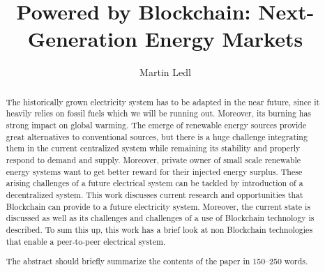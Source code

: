 \documentclass[runningheads]{llncs}
\begin{document}
%
\title{Powered by Blockchain: Next-Generation Energy Markets}
%
%
\author{Martin Ledl}
%
%
%
\maketitle              %
%
\begin{abstract}
The historically grown electricity system has to be adapted in the near future, since it heavily relies on fossil fuels which we will be running out. Moreover, its burning has strong impact on global warming. The emerge of renewable energy sources provide great alternatives to conventional sources, but there is a huge challenge integrating them in the current centralized system while remaining its stability and properly respond to demand and supply. Moreover, private owner of small scale renewable energy systems want to get better reward for their injected energy surplus. These arising challenges of a future electrical system can be tackled by introduction of a decentralized system. This work discusses current research and opportunities that Blockchain can provide to a future electricity system. Moreover, the current state is discussed as well as its challenges and challenges of a use of Blockchain technology is described. To sum this up, this work has a brief look at non Blockchain technologies that enable a peer-to-peer electrical system.

The abstract should briefly summarize the contents of the paper in
150--250 words.

\end{abstract}
%
%
%
\end{document}
